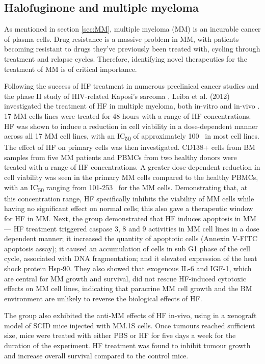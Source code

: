 \subsection{Halofuginone and multiple myeloma}\label{subsec:HF_MM}

As mentioned in section \ref{sec:MM}, multiple myeloma (MM) is an incurable cancer of plasma cells.
Drug resistance is a massive problem in MM, with patients becoming resistant to drugs they've previously been treated with, cycling through treatment and relapse cycles.
Therefore, identifying novel therapeutics for the treatment of MM is of critical importance.

Following the success of HF treatment in numerous preclinical cancer studies and the phase II study of HIV-related Kaposi's sarcoma \cite{koon2011phase}, Leiba et al. (2012) investigated the treatment of HF in multiple myeloma, both in-vitro and in-vivo \cite{leiba2012halofuginone}.
17 MM cells lines were treated for 48 hours with a range of HF concentrations.
HF was shown to induce a reduction in cell viability in a dose-dependent manner across all 17 MM cell lines, with an IC\textsubscript{50} of approximately 100\si{\nano\Molar} in most cell lines.
The effect of HF on primary cells was then investigated.
CD138+ cells from BM samples from five MM patients and PBMCs from two healthy donors were treated with a range of HF concentrations.
A greater dose-dependent reduction in cell viability was seen in the primary MM cells compared to the healthy PBMCs, with an IC\textsubscript{50} ranging from 101-253\si{\nano\Molar} for the MM cells.
Demonstrating that, at this concentration range, HF specifically inhibits the viability of MM cells while having no significant effect on normal cells; this also gave a therapeutic window for HF in MM.
Next, the group demonstrated that HF induces apoptosis in MM--- HF treatment triggered caspase 3, 8 and 9 activities in MM cell lines in a dose dependent manner; it increased the quantity of apoptotic cells (Annexin V-FITC apoptosis assay); it caused an accumulation of cells in sub G1 phase of the cell cycle, associated with DNA fragmentation; and it elevated expression of the heat shock protein Hsp-90.
They also showed that exogenous IL-6 and IGF-1, which are central for MM growth and survival, did not rescue HF-induced cytotoxic effects on MM cell lines, indicating that paracrine MM cell growth and the BM environment are unlikely to reverse the biological effects of HF.

The group also exhibited the anti-MM effects of HF in-vivo, using in a xenograft model of SCID mice injected with MM.1S cells.
Once tumours reached sufficient size, mice were treated with either PBS or HF for five days a week for the duration of the experiment.
HF treatment was found to inhibit tumour growth and increase overall survival compared to the control mice.

